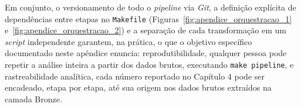 Em conjunto, o versionamento de todo o \textit{pipeline} via \textit{Git}, a definição explícita de dependências entre etapas no \texttt{Makefile} (Figuras~\ref{fig:apendice_orquestracao_1} e~\ref{fig:apendice_orquestracao_2}) e a separação de cada transformação em um \textit{script} independente garantem, na prática, o que o objetivo específico documentado neste apêndice enuncia: reprodutibilidade, qualquer pessoa pode repetir a análise inteira a partir dos dados brutos, executando \texttt{make pipeline}, e rastreabilidade analítica, cada número reportado no Capítulo 4 pode ser encadeado, etapa por etapa, até sua origem nos dados brutos extraídos na camada Bronze.
